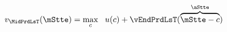 \begin{equation}\begin{gathered}\begin{aligned}
  {\vFunc}_{\MidPrdLsT}(\mStte)  & = \max_{\cNrm} ~~ \uFunc(\cNrm) +
                              \vEndPrdLsT(\overbrace{\mStte-\cNrm}^{\aStte})
                              \label{eq:vEndTm1}
\end{aligned}\end{gathered}\end{equation}
